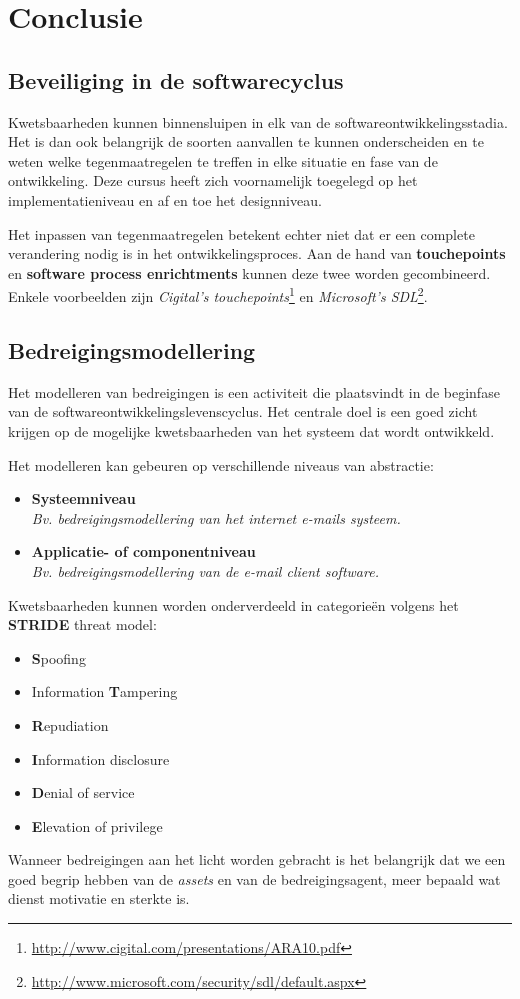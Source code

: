 \documentclass[../main.tex]{subfiles}
\begin{document}
\chapter{Conclusie}

\section{Beveiliging in de softwarecyclus}
Kwetsbaarheden kunnen binnensluipen in elk van de softwareontwikkelingsstadia.
Het is dan ook belangrijk de soorten aanvallen te kunnen onderscheiden en te weten welke tegenmaatregelen te treffen in elke situatie en fase van de ontwikkeling.
Deze cursus heeft zich voornamelijk toegelegd op het implementatieniveau en af en toe het designniveau.

Het inpassen van tegenmaatregelen betekent echter niet dat er een complete verandering nodig is in het ontwikkelingsproces.
Aan de hand van \textbf{touchepoints} en \textbf{software process enrichtments} kunnen deze twee worden gecombineerd.
Enkele voorbeelden zijn \textit{Cigital's touchepoints}\footnote{\url{http://www.cigital.com/presentations/ARA10.pdf}} en \textit{Microsoft's SDL}\footnote{\url{http://www.microsoft.com/security/sdl/default.aspx}}.

\section{Bedreigingsmodellering}
Het modelleren van bedreigingen is een activiteit die plaatsvindt in de beginfase van de softwareontwikkelingslevenscyclus. Het centrale doel is een goed zicht krijgen op de mogelijke kwetsbaarheden van het systeem dat wordt ontwikkeld.

Het modelleren kan gebeuren op verschillende niveaus van abstractie:
\begin{itemize}
	\item \textbf{Systeemniveau} \\ \textit{Bv. bedreigingsmodellering van het internet e-mails systeem.}
	\item \textbf{Applicatie- of componentniveau} \\ \textit{Bv. bedreigingsmodellering van de e-mail client software.}
\end{itemize}
\noindent
Kwetsbaarheden kunnen worden onderverdeeld in categorie\"en volgens het \textbf{STRIDE} threat model:
\begin{itemize}
	\item \textbf{S}poofing
	\item Information \textbf{T}ampering
	\item \textbf{R}epudiation
	\item \textbf{I}nformation disclosure
	\item \textbf{D}enial of service
	\item \textbf{E}levation of privilege
\end{itemize}
Wanneer bedreigingen aan het licht worden gebracht is het belangrijk dat we een goed begrip hebben van de \textit{assets} en van de bedreigingsagent, meer bepaald wat dienst motivatie en sterkte is.
\end{document}
